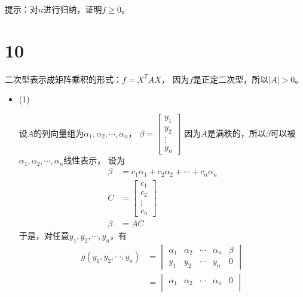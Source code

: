 \documentclass{article}
\begin{document}
提示：对$n$进行归纳，证明$f \geq 0$。

\section*{10}

二次型表示成矩阵乘积的形式：$f = X^T A X$，
因为$f$是正定二次型，所以$|A|>0$。

\begin{itemize}
  \item (1)

        设$A$的列向量组为$\alpha_1, \alpha_2, \cdots, \alpha_n$，
        $\beta = \begin{bmatrix}
            y_1    \\
            y_2    \\
            \vdots \\
            y_n
          \end{bmatrix}$
        因为$A$是满秩的，所以$\beta$可以被$\alpha_1, \alpha_2, \cdots, \alpha_n$线性表示，
        设为
        \begin{align*}
          \beta & = c_1 \alpha_1 + c_2 \alpha_2 + \cdots + c_n \alpha_n \\
          C     & = \begin{bmatrix}
                      c_1    \\
                      c_2    \\
                      \vdots \\
                      c_n
                    \end{bmatrix}                                      \\
          \beta & = A C
        \end{align*}
        于是，对任意$y_1, y_2, \cdots, y_n$，有
        \begin{align*}
          g(y_1, y_2, \cdots, y_n) & = \begin{vmatrix}
                                         \alpha_1 & \alpha_2 & \cdots & \alpha_n & \beta \\
                                         y_1      & y_2      & \cdots & y_n      & 0
                                       \end{vmatrix}                                  \\
                                   & =\begin{vmatrix}
                                        \alpha_1 & \alpha_2 & \cdots & \alpha_n & 0                                       \\

\end{vmatrix}
\end{align*}
\end{itemize}
\end{document}
